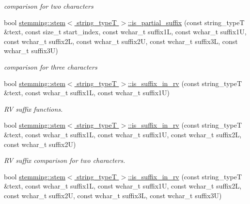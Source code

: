\begin{DoxyCompactItemize}
\begin{DoxyCompactList}\small\item\em comparison for two characters \end{DoxyCompactList}\item 
\hypertarget{group___stemming_ga728ea4e26737b04d04e02bea863f29e4}{bool \hyperlink{group___stemming_ga728ea4e26737b04d04e02bea863f29e4}{stemming\-::stem$<$ string\-\_\-type\-T $>$\-::is\-\_\-partial\-\_\-suffix} (const string\-\_\-type\-T \&text, const size\-\_\-t start\-\_\-index, const wchar\-\_\-t suffix1\-L, const wchar\-\_\-t suffix1\-U, const wchar\-\_\-t suffix2\-L, const wchar\-\_\-t suffix2\-U, const wchar\-\_\-t suffix3\-L, const wchar\-\_\-t suffix3\-U)}\label{group___stemming_ga728ea4e26737b04d04e02bea863f29e4}

\begin{DoxyCompactList}\small\item\em comparison for three characters \end{DoxyCompactList}\item 
bool \hyperlink{group___stemming_ga2c92d7447b5cc97d0fca165d2b0e7d68}{stemming\-::stem$<$ string\-\_\-type\-T $>$\-::is\-\_\-suffix\-\_\-in\-\_\-rv} (const string\-\_\-type\-T \&text, const wchar\-\_\-t suffix1\-L, const wchar\-\_\-t suffix1\-U)
\begin{DoxyCompactList}\small\item\em R\-V suffix functions. \end{DoxyCompactList}\item 
\hypertarget{group___stemming_ga359356fbaafc3c7154d94fda6916ffa0}{bool \hyperlink{group___stemming_ga359356fbaafc3c7154d94fda6916ffa0}{stemming\-::stem$<$ string\-\_\-type\-T $>$\-::is\-\_\-suffix\-\_\-in\-\_\-rv} (const string\-\_\-type\-T \&text, const wchar\-\_\-t suffix1\-L, const wchar\-\_\-t suffix1\-U, const wchar\-\_\-t suffix2\-L, const wchar\-\_\-t suffix2\-U)}\label{group___stemming_ga359356fbaafc3c7154d94fda6916ffa0}

\begin{DoxyCompactList}\small\item\em R\-V suffix comparison for two characters. \end{DoxyCompactList}\item 
\hypertarget{group___stemming_ga00fa5d00ff53320a437fe96a5bfa8f44}{bool \hyperlink{group___stemming_ga00fa5d00ff53320a437fe96a5bfa8f44}{stemming\-::stem$<$ string\-\_\-type\-T $>$\-::is\-\_\-suffix\-\_\-in\-\_\-rv} (const string\-\_\-type\-T \&text, const wchar\-\_\-t suffix1\-L, const wchar\-\_\-t suffix1\-U, const wchar\-\_\-t suffix2\-L, const wchar\-\_\-t suffix2\-U, const wchar\-\_\-t suffix3\-L, const wchar\-\_\-t suffix3\-U)}\label{group___stemming_ga00fa5d00ff53320a437fe96a5bfa8f44}


\end{DoxyCompactItemize}

